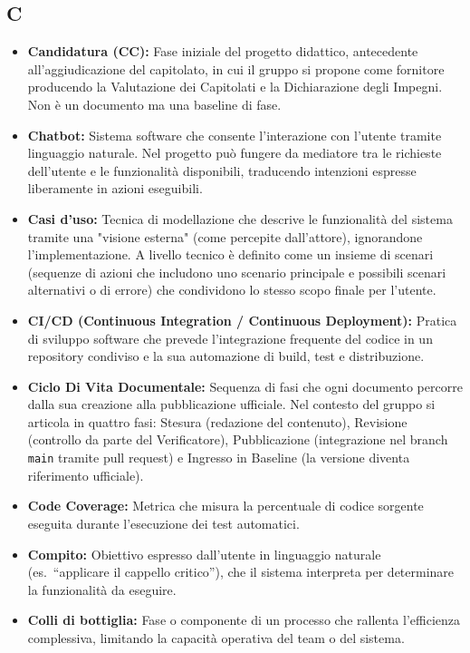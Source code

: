 {}
\subsection*{C}
\begin{itemize}[leftmargin=*]
      \item \textbf{Candidatura (CC):} Fase iniziale del progetto didattico, antecedente
          all'aggiudicazione del capitolato, in cui il gruppo si propone come
          fornitore producendo la Valutazione dei Capitolati e la Dichiarazione degli
          Impegni. Non è un documento ma una baseline di fase.
      \item \textbf{Chatbot:} Sistema software che consente l'interazione con l'utente tramite linguaggio naturale. Nel progetto può fungere da mediatore tra le richieste dell'utente e le funzionalità disponibili, traducendo intenzioni espresse liberamente in azioni eseguibili.
      \item \textbf{Casi d'uso:} Tecnica di modellazione che descrive le funzionalità del sistema tramite una "visione esterna" (come percepite dall'attore), ignorandone l'implementazione. A livello tecnico è definito come un insieme di scenari (sequenze di azioni che includono uno scenario principale e possibili scenari alternativi o di errore) che condividono lo stesso scopo finale per l'utente.
      \item  \textbf{CI/CD (Continuous Integration / Continuous Deployment):} Pratica di sviluppo software che prevede l’integrazione frequente del codice in un repository condiviso e la sua automazione di build, test e distribuzione.
      \item \textbf{Ciclo Di Vita Documentale:} Sequenza di fasi che ogni documento
          percorre dalla sua creazione alla pubblicazione ufficiale. Nel contesto
          del gruppo si articola in quattro fasi: Stesura (redazione del contenuto),
          Revisione (controllo da parte del Verificatore), Pubblicazione (integrazione
          nel branch \texttt{main} tramite pull request) e Ingresso in Baseline
          (la versione diventa riferimento ufficiale).
      \item \textbf{Code Coverage:} Metrica che misura la percentuale di codice sorgente eseguita durante l’esecuzione dei test automatici.
      \item \textbf{Compito:} Obiettivo espresso dall'utente in linguaggio naturale (es.\ ``applicare il cappello critico''), che il sistema interpreta per determinare la funzionalità da eseguire.
      \item \textbf{Colli di bottiglia:} Fase o componente di un processo che rallenta l'efficienza complessiva, limitando la capacità operativa del team o del sistema.
\end{itemize}
 
